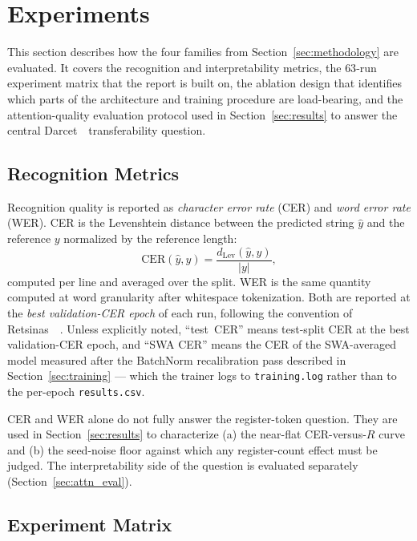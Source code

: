 \section{Experiments}
\label{sec:experiments}

This section describes how the four families from Section~\ref{sec:methodology} are evaluated. It covers the recognition and interpretability metrics, the $63$-run experiment matrix that the report is built on, the ablation design that identifies which parts of the architecture and training procedure are load-bearing, and the attention-quality evaluation protocol used in Section~\ref{sec:results} to answer the central Darcet~\etal\ transferability question.

\subsection{Recognition Metrics}
\label{sec:metrics_reco}

Recognition quality is reported as \emph{character error rate} (CER) and \emph{word error rate} (WER). CER is the Levenshtein distance between the predicted string $\hat{y}$ and the reference $y$ normalized by the reference length:
\begin{equation}
\label{eq:cer}
\mathrm{CER}(\hat{y}, y) = \frac{d_{\mathrm{Lev}}(\hat{y}, y)}{|y|},
\end{equation}
computed per line and averaged over the split. WER is the same quantity computed at word granularity after whitespace tokenization. Both are reported at the \emph{best validation-CER epoch} of each run, following the convention of Retsinas~\etal~\cite{retsinas2022htrbestpractices}. Unless explicitly noted, ``test~CER'' means test-split CER at the best validation-CER epoch, and ``SWA CER'' means the CER of the SWA-averaged model measured after the BatchNorm recalibration pass described in Section~\ref{sec:training} --- which the trainer logs to \texttt{training.log} rather than to the per-epoch \texttt{results.csv}.

CER and WER alone do not fully answer the register-token question. They are used in Section~\ref{sec:results} to characterize (a) the near-flat CER-versus-$R$ curve and (b) the seed-noise floor against which any register-count effect must be judged. The interpretability side of the question is evaluated separately (Section~\ref{sec:attn_eval}).

\subsection{Experiment Matrix}
\label{sec:matrix}

